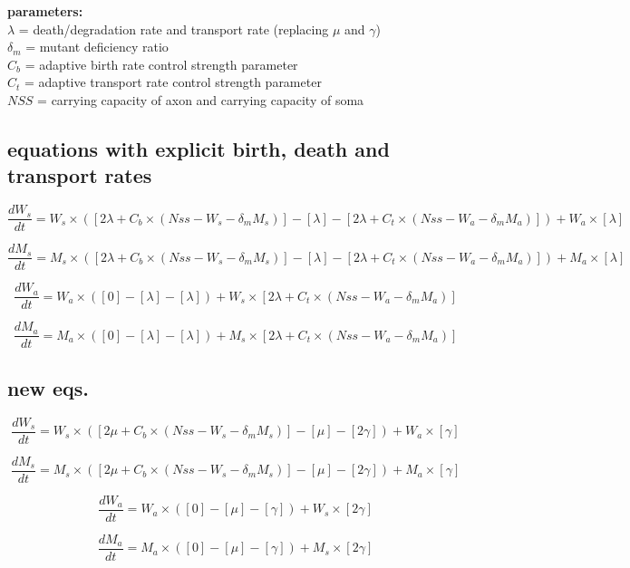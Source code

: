 \documentclass[]{article}
\begin{document}
\noindent \textbf{parameters:} \\
$\lambda$ = death/degradation rate and transport rate (replacing $\mu$ and $\gamma$)\\
$\delta_m$ = mutant deficiency ratio \\
$C_b$ = adaptive birth rate control strength parameter \\
$C_t$ = adaptive transport rate control strength parameter \\
$NSS$ = carrying capacity of axon and carrying capacity of soma \\


\subsection{equations with explicit birth, death and transport rates}

\begin{equation}
	\frac{d W_s}{d t} = W_s \times \left( [2\lambda + C_b \times (Nss-W_s-\delta_m M_s) ] - [\lambda] - [2\lambda + C_t \times (Nss - W_a - \delta_m M_a)]\right) + W_a \times [\lambda] 
\end{equation}

\begin{equation}
	\frac{d M_s}{d t} = M_s \times \left( [2\lambda + C_b \times (Nss-W_s-\delta_m M_s) ] - [\lambda] - [2\lambda + C_t \times (Nss - W_a - \delta_m M_a)]\right) + M_a \times [\lambda] 
\end{equation}

\begin{equation}
	\frac{d W_a}{d t} = W_a \times \left( [0] - [\lambda] - [\lambda] \right) + W_s \times [2\lambda + C_t \times (Nss - W_a - \delta_m M_a)]
\end{equation}

\begin{equation}
	\frac{d M_a}{d t} = M_a \times \left( [0] - [\lambda] - [\lambda] \right) + M_s \times [2\lambda + C_t \times (Nss - W_a - \delta_m M_a)]
\end{equation}		
\pagebreak
\subsection{new eqs.}

\begin{equation}
	\frac{d W_s}{d t} = W_s \times \left( [2\mu + C_b \times (Nss-W_s-\delta_m M_s) ] - [\mu] - [2\gamma]\right) + W_a \times [\gamma] 
\end{equation}

\begin{equation}
	\frac{d M_s}{d t} = M_s \times \left( [2\mu + C_b \times (Nss-W_s-\delta_m M_s) ] - [\mu] - [2\gamma]\right) + M_a \times [\gamma] 
\end{equation}

\begin{equation}
	\frac{d W_a}{d t} = W_a \times \left( [0] - [\mu] - [\gamma] \right) + W_s \times [2\gamma]
\end{equation}

\begin{equation}
	\frac{d M_a}{d t} = M_a \times \left( [0] - [\mu] - [\gamma] \right) + M_s \times [2\gamma]
\end{equation}		
\end{document}
